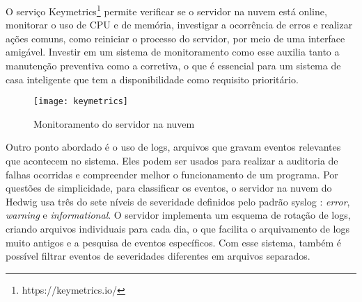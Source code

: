O serviço Keymetrics\footnote{https://keymetrics.io/} permite verificar se o servidor na nuvem está online, monitorar o uso de CPU e de memória, investigar a ocorrência de erros e realizar ações comuns, como reiniciar o processo do servidor, por meio de uma interface amigável. Investir em um sistema de monitoramento como esse auxilia tanto a manutenção preventiva como a corretiva, o que é essencial para um sistema de casa inteligente que tem a disponibilidade como requisito prioritário.

\begin{figure}[H]
	\centering
	\caption{Monitoramento do servidor na nuvem}
  \texttt{[image: keymetrics]}
\label{fig:keymetrics}
\end{figure}

Outro ponto abordado é o uso de logs, arquivos que gravam eventos relevantes que acontecem no sistema. Eles podem ser usados para realizar a auditoria de falhas ocorridas e compreender melhor o funcionamento de um programa. Por questões de simplicidade, para classificar os eventos, o servidor na nuvem do Hedwig usa três do sete níveis de severidade definidos pelo padrão syslog \cite{rfc5424}: \emph{error}, \emph{warning} e \emph{informational}. O servidor implementa um esquema de rotação de logs, criando arquivos individuais para cada dia, o que facilita o arquivamento de logs muito antigos e a pesquisa de eventos específicos. Com esse sistema, também é possível filtrar eventos de severidades diferentes em arquivos separados.
